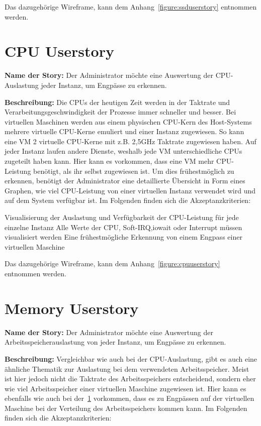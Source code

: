 Das dazugehörige Wireframe, kann dem Anhang~\ref{figure:ssduserstory} entnommen
werden.
\mr%

\section{CPU Userstory}
\label{section:CPU_Userstory}
\textbf{Name der Story:} Der Administrator möchte eine Auswertung der
CPU-Auslastung jeder Instanz, um Engpässe zu erkennen.

\textbf{Beschreibung:} Die CPUs der heutigen Zeit werden in der Taktrate und
Verarbeitungsgeschwindigkeit der Prozesse immer schneller und besser. Bei
virtuellen Maschinen werden aus einem physischen CPU-Kern des Host-Systems
mehrere virtuelle CPU-Kerne emuliert und einer Instanz zugewiesen. So kann eine
VM 2 virtuelle CPU-Kerne mit z.B. 2,5\si{\giga\hertz} Taktrate zugewiesen
haben. Auf jeder Instanz laufen andere Dienste, weshalb jede VM
unterschiedliche CPUs zugeteilt haben kann. Hier kann es vorkommen, dass eine
VM mehr CPU-Leistung benötigt, als ihr selbst zugewiesen ist. Um dies
frühestmöglich zu erkennen, benötigt der Administrator eine detaillierte
Übersicht in Form eines Graphen, wie viel CPU-Leistung von einer virtuellen
Instanz verwendet wird und auf dem System verfügbar ist. Im Folgenden finden
sich die Akzeptanzkriterien:

\begin{outline}
  \1 Visualisierung der Auslastung und Verfügbarkeit der CPU-Leistung für jede
  einzelne Instanz
  \1 Alle Werte der CPU, \gls{Soft-IRQ},\gls{iowait} oder \gls{Interrupt}
  müssen visualisiert werden
  \1 Eine frühestmögliche Erkennung von einem Engpass einer virtuellen Maschine
\end{outline}

Das dazugehörige Wireframe, kann dem Anhang~\ref{figure:cpuuserstory} entnommen
werden.
\mr%

\section{Memory Userstory}
\textbf{Name der Story:} Der Administrator möchte eine Auswertung der
Arbeitsspeicherauslastung von jeder Instanz, um Engpässe zu erkennen.

\textbf{Beschreibung:} Vergleichbar wie auch bei der CPU-Auslastung, gibt es
auch eine ähnliche Thematik zur Auslastung bei dem verwendeten Arbeitsspeicher.
Meist ist hier jedoch nicht die Taktrate des Arbeitsspeichers entscheidend,
sondern eher wie viel Arbeitsspeicher einer virtuellen Maschine zugewiesen ist.
Hier kann es ebenfalls wie auch bei der~\ref{section:CPU_Userstory}
vorkommen, dass es zu Engpässen auf der virtuellen Maschine bei der Verteilung
des Arbeitsspeichers kommen kann. Im Folgenden finden sich die
Akzeptanzkriterien:

